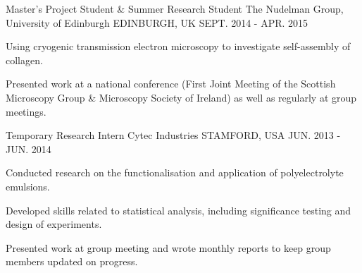 \begin{cventries}
  \cventry
    {Master's Project Student \& Summer Research Student}
    {The Nudelman Group, University of Edinburgh}
    {EDINBURGH, UK}
    {SEPT. 2014 - APR. 2015}
    {
      \begin{cvitems}
        \item {Using cryogenic transmission electron microscopy to investigate self-assembly of collagen.}
        \item {Presented work at a national conference (First Joint Meeting of the Scottish Microscopy Group \& Microscopy Society of Ireland) as well as regularly at group meetings.}
      \end{cvitems}
    }
  \cventry
    {Temporary Research Intern}
    {Cytec Industries}
    {STAMFORD, USA}
    {JUN. 2013 - JUN. 2014}
    {
      \begin{cvitems}
        \item {Conducted research on the functionalisation and application of polyelectrolyte emulsions.}
        \item {Developed skills related to statistical analysis, including significance testing and design of experiments.}
		    \item {Presented work at group meeting and wrote monthly reports to keep group members updated on progress.}
      \end{cvitems}
    }
\end{cventries}

